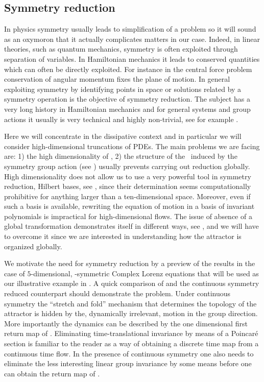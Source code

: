 \subsection{Symmetry reduction}

In physics symmetry usually leads to simplification of a problem so it will sound as an oxymoron that it actually
complicates matters in our case. Indeed, in linear theories, such as quantum mechanics, symmetry is often exploited
through separation of variables. In Hamiltonian mechanics it leads to conserved quantities which can often be
directly exploited. For instance in the central force problem conservation of angular momentum fixes the plane
of motion. %
In general exploiting symmetry by identifying points in space or solutions
related by a symmetry operation is the objective of
symmetry reduction. The subject has a very long history in Hamiltonian mechanics and for general systems
and group actions it usually is very technical and highly non-trivial, see for example
.

Here we will concentrate in the dissipative context and in particular we will consider high-dimensional truncations
of PDEs. The main problems we are facing are: 1) the high dimensionality of \statesp, 2) the structure of
the \statesp\ induced by the symmetry group action (see )
usually prevents carrying out reduction globally.
High dimensionality does not allow us to use a very powerful tool in symmetry reduction, Hilbert bases,
see , since their determination seems computationally prohibitive for anything larger
than a ten-dimensional space. Moreover, even if such a basis is available,
rewriting the equation of motion in a basis of invariant polynomials is impractical for high-dimensional
flows. The issue of absence of  a global transformation demonstrates itself in different
ways, see , and we will have to overcome it since we are interested in understanding
how the attractor is organized globally.

We motivate the need for symmetry reduction by a preview of the results in the case of $5$-dimensional,
-symmetric Complex Lorenz equations that will be used as our illustrative example in .
 A quick comparison of
 and the continuous symmetry reduced  counterpart should demonstrate the problem.
Under continuous symmetry the ``stretch and fold'' mechanism that determines the topology of the attractor
is hidden by the, dynamically irrelevant, motion in the group direction. More importantly the dynamics can
be described by the one dimensional first return map of . Eliminating time-translational
invariance by means of a Poincar\'e section is familiar to the reader as a way of obtaining a discrete time map from
a continuous time flow. In the presence of continuous symmetry one also needs to eliminate the less interesting
linear group invariance by some means before one can obtain the return map of .

